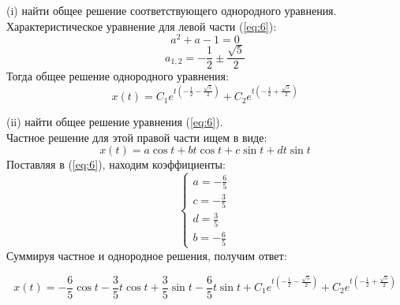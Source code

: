 \documentclass[a4paper, 12pt]{article}
\begin{document}
(i) найти общее решение соответствующего однородного уравнения.\\
Характеристическое уравнение для левой части (\ref{eq:6}):
\[a^2+a-1=0\]
\[a_{1,2}=-\frac 1 2 \pm \frac {\sqrt{5}}{2}\]
Тогда общее решение однородного уравнения:
\begin{equation}
x(t) = C_1e^{t\left(-\frac 1 2 - \frac {\sqrt{5}}{2}\right)}+C_2e^{t\left(-\frac 1 2 + \frac {\sqrt{5}}{2}\right)}
\label{eq:7}
\end{equation}

(ii) найти общее решение уравнения (\ref{eq:6}).\\
Частное решение для этой правой части ищем в виде:
\[ x(t) = a\cos{t}+bt\cos{t}+c\sin{t}+dt\sin{t}\]
Поставляя в (\ref{eq:6}), находим коэффициенты: 
\[
\left\{
\begin{array}{lr}
a = -\frac 6 5 \\
c = - \frac 3 5 \\
d =  \frac 3 5 \\
b=- \frac 6 5 
\end{array}
\right.
\]
Суммируя частное и однородное решения, получим ответ:

\[x(t) = -\frac 6 5\cos{t} - \frac 3 5 t \cos{t} + \frac 3 5 \sin{t} - \frac 6 5 t\sin{t} + C_1e^{t\left(-\frac 1 2 - \frac {\sqrt{5}}{2}\right)}+C_2e^{t\left(-\frac 1 2 + \frac {\sqrt{5}}{2}\right)} \]
\end{document}
